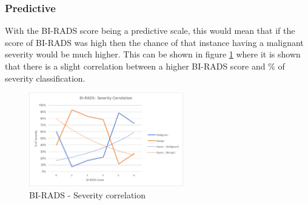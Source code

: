 \documentclass[12pt]{article}
\begin{document}
      \subsubsection{Predictive}
        With the BI-RADS score being a predictive scale, this would mean that if the score of BI-RADS was high then the chance of that instance having a malignant severity would be much higher. This can be shown in figure \ref{fig:birads-severity-correlation} where it is shown that there is a slight correlation between a higher BI-RADS score and \% of severity classification.

        \begin{figure}[H]
          \centering
          \includegraphics[width=0.6\textwidth]{birads-severity-correlation}
          \caption{BI-RADS - Severity correlation}
          \label{fig:birads-severity-correlation}
        \end{figure}
\end{document}
